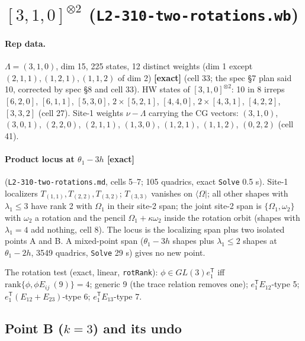 \documentclass[11pt]{article}
\newcommand{\bra}[1]{\langle #1|}
\newcommand{\Om}{\Omega}
\newcommand{\eT}{e_1^{\mathsf T}}
\newcommand{\Tt}[1]{T_{#1}}
\newcommand{\ex}{\textbf{[exact]}}
\newcommand{\nb}[1]{\texttt{#1}}
\begin{document}
\section{$[3,1,0]^{\otimes2}$ (\nb{L2-310-two-rotations.wb})}\label{sec:310}

\paragraph{Rep data.} $\Lambda=(3,1,0)$, dim 15, 225 states, 12 distinct weights (dim 1 except $(2,1,1),(1,2,1),(1,1,2)$ of dim 2) \ex{} (cell 33; the spec \S7 plan said 10, corrected by spec \S8 and cell 33). HW states of $[3,1,0]^{\otimes2}$: 10 in 8 irreps $[6,2,0]$, $[6,1,1]$, $[5,3,0]$, $2\times[5,2,1]$, $[4,4,0]$, $2\times[4,3,1]$, $[4,2,2]$, $[3,3,2]$ (cell 27). Site-1 weights $\nu-\Lambda$ carrying the CG vectors: $(3,1,0)$, $(3,0,1)$, $(2,2,0)$, $(2,1,1)$, $(1,3,0)$, $(1,2,1)$, $(1,1,2)$, $(0,2,2)$ (cell 41).

\paragraph{Product locus at $\theta_1-3h$ \ex} (\nb{L2-310-two-rotations.md}, cells 5--7; 105 quadrics, exact \texttt{Solve} 0.5 s). Site-1 localizers $\Tt{(1,1)},\Tt{(2,2)},\Tt{(3,2)}$; $\Tt{(3,3)}$ vanishes on $\bra\Om$; all other shapes with $\lambda_1\le3$ have rank 2 with $\Om_1$ in their site-2 span; the joint site-2 span is $\{\Om_1,\omega_2\}$ with $\omega_2$ a rotation and the pencil $\Om_1+\kappa\omega_2$ inside the rotation orbit (shapes with $\lambda_1=4$ add nothing, cell 8). The locus is the localizing span plus two isolated points A and B. A mixed-point span ($\theta_1-3h$ shapes plus $\lambda_1\le2$ shapes at $\theta_1-2h$, 3549 quadrics, \texttt{Solve} 29 s) gives no new point.

The rotation test (exact, linear, \nb{rotRank}): $\phi\in GL(3)\eT$ iff $\mathrm{rank}\{\phi,\phi E_{ij}\ (9)\}=4$; generic 9 (the trace relation removes one); $\eT E_{12}$-type 5; $\eT(E_{12}+E_{23})$-type 6; $\eT E_{13}$-type 7.

\subsection{Point B ($k=3$) and its undo}
\end{document}
